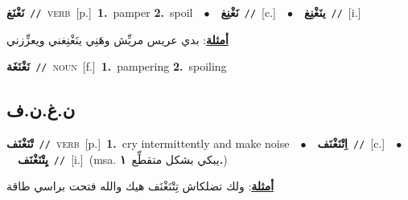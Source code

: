 \documentclass[10pt,a4paper,twoside]{article} %
\begin{document}
\begin{multicols}{2}
{\setlength\topsep{0pt}\textbf{\foreignlanguage{arabic}{نَغْنَغ}}\ {\color{gray}\texttt{//}\color{black}}\ \textsc{verb}\ [p.]\ \textbf{1.}~pamper  \textbf{2.}~spoil\ \ $\bullet$\ \ \setlength\topsep{0pt}\textbf{\foreignlanguage{arabic}{نَغْنِغ}}\ {\color{gray}\texttt{//}\color{black}}\ [c.]\ \ $\bullet$\ \ \setlength\topsep{0pt}\textbf{\foreignlanguage{arabic}{ينَغْنِغ}}\ {\color{gray}\texttt{//}\color{black}}\ [i.]\  \begin{flushright}\color{gray}\foreignlanguage{arabic}{\textbf{\underline{\foreignlanguage{arabic}{أمثلة}}}: بدي عريس مريِّش وهَنِي ينَغْنِغني ويعزِّزني}\end{flushright}\color{black}} \vspace{2mm}

{\setlength\topsep{0pt}\textbf{\foreignlanguage{arabic}{نَغْنَغَة}}\ {\color{gray}\texttt{//}\color{black}}\ \textsc{noun}\ [f.]\ \textbf{1.}~pampering  \textbf{2.}~spoiling\ } \vspace{2mm}

\vspace{-3mm}
\subsection*{\color{blue}\foreignlanguage{arabic}{ن.غ.ن.ف}\color{blue}{}} 

{\setlength\topsep{0pt}\textbf{\foreignlanguage{arabic}{تْنَغْنَف}}\ {\color{gray}\texttt{//}\color{black}}\ \textsc{verb}\ [p.]\ \textbf{1.}~cry intermittently and make noise\ \ $\bullet$\ \ \setlength\topsep{0pt}\textbf{\foreignlanguage{arabic}{اِتْنَغْنَف}}\ {\color{gray}\texttt{//}\color{black}}\ [c.]\ \ $\bullet$\ \ \setlength\topsep{0pt}\textbf{\foreignlanguage{arabic}{يِتْنَغْنَف}}\ {\color{gray}\texttt{//}\color{black}}\ [i.]\ \color{gray}(msa. \foreignlanguage{arabic}{يبكي بشكل متقطِّع}~\foreignlanguage{arabic}{\textbf{١.}})\color{black}\  \begin{flushright}\color{gray}\foreignlanguage{arabic}{\textbf{\underline{\foreignlanguage{arabic}{أمثلة}}}: ولك تضلكاش تِتْنَغْنَف هيك والله فتحت براسي طاقة}\end{flushright}\color{black}} \vspace{2mm}


\end{multicols}
\end{document}
